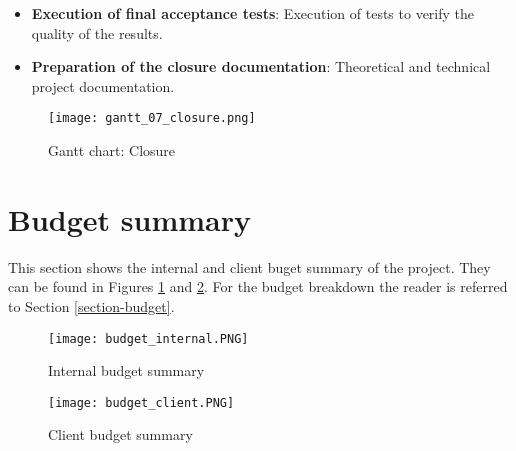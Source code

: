 \begin{itemize}
    \item \textbf{Execution of final acceptance tests}: Execution of tests to verify the quality of the results.
    \item \textbf{Preparation of the closure documentation}: Theoretical and technical project documentation.
\end{itemize}

\begin{figure}[H]
    \caption{Gantt chart: Closure}
  \centering
  \texttt{[image: gantt\_07\_closure.png]}
\end{figure}



\section{Budget summary}

This section shows the internal and client buget summary of the project. They can be found in Figures \ref{fig-overview-internal-budget} and \ref{fig-overview-client-budget}. For the budget breakdown the reader is referred to Section \ref{section-budget}.


\begin{figure}[H]
    \caption{Internal budget summary}
    \label{fig-overview-internal-budget}
  \centering
  \texttt{[image: budget\_internal.PNG]}
\end{figure}

\begin{figure}[H]
    \caption{Client budget summary}
    \label{fig-overview-client-budget}
  \centering
  \texttt{[image: budget\_client.PNG]}
\end{figure}



